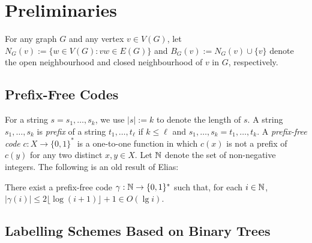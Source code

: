 \documentclass[kpfonts]{patmorin}
\newcommand{\snote}[1]{\fcolorbox{red}{yellow}{#1}}
\DeclareMathOperator{\A}{\mathds{A}}
\begin{document}

% 



\section{Preliminaries}

For any graph $G$ and any vertex $v\in V(G)$, let $N_G(v):=\{w\in V(G): vw\in E(G)\}$ and $B_G(v):=N_G(v)\cup\{v\}$ denote the open neighbourhood and closed neighbourhood of $v$ in $G$, respectively.

\subsection{Prefix-Free Codes}

For a string $s=s_1,\ldots,s_k$, we use $|s|:=k$ to denote the length of $s$. A string $s_1,\ldots,s_k$ is \emph{prefix} of a string $t_1,\ldots,t_\ell$ if $k\le \ell$ and $s_1,\ldots,s_k=t_1,\ldots,t_k$.  A \emph{prefix-free code} $c:X\to\{0,1\}^*$ is a one-to-one function in which $c(x)$ is not a prefix of $c(y)$ for any two distinct $x,y\in X$.  Let $\mathbb{N}$ denote the set of non-negative integers.  The following is an old result of Elias:

\begin{lem}
    There exist a prefix-free code $\gamma:\mathbb{N}\to\{0,1\}^*$ such that, for each $i\in\mathbb{N}$, $|\gamma(i)|\le 2\lfloor\log(i+1)\rfloor + 1\in O(\lg i)$.
\end{lem}

\subsection{Labelling Schemes Based on Binary Trees}
\end{document}
